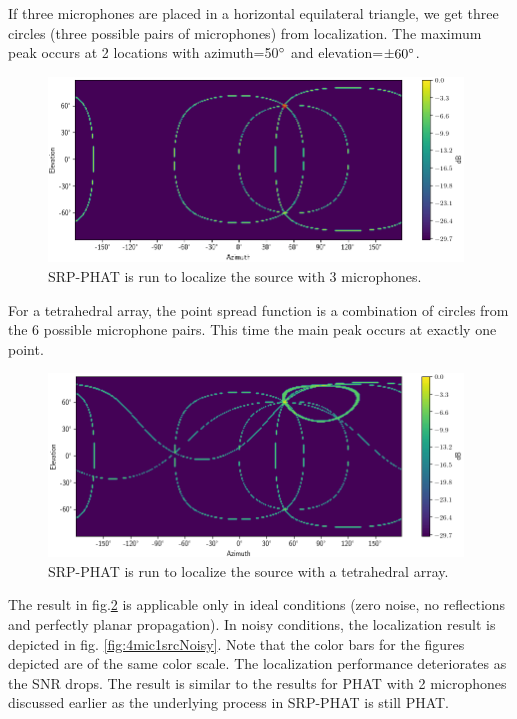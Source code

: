 If three microphones are placed in a horizontal equilateral triangle, we get three circles (three possible pairs of microphones) from localization. The maximum peak occurs at 2 locations with azimuth=50$\degree$ and elevation=$\pm 60\degree$.
\begin{figure}[H]
    \centering
    \includegraphics[width=0.98\textwidth]{Figures/3mic1srcRes.png}
    \caption{SRP-PHAT is run to localize the source with 3 microphones.}
    \label{fig:3mic1src}
\end{figure}

For a tetrahedral array, the point spread function is a combination of circles from the 6 possible microphone pairs. This time the main peak occurs at exactly one point. 
\begin{figure}[H]
    \centering
    \includegraphics[width=0.98\textwidth]{Figures/4mic1srcRes.png}
    \caption{SRP-PHAT is run to localize the source with a tetrahedral array.}
    \label{fig:4mic1src}
\end{figure}

The result in fig.\ref{fig:4mic1src} is applicable only in ideal conditions (zero noise, no reflections and perfectly planar propagation). In noisy conditions, the localization result is depicted in fig. \ref{fig:4mic1srcNoisy}. Note that the color bars for the figures depicted are of the same color scale. The localization performance deteriorates as the SNR drops. The result is similar to the results for PHAT with 2 microphones discussed earlier as the underlying process in SRP-PHAT is still PHAT. 

